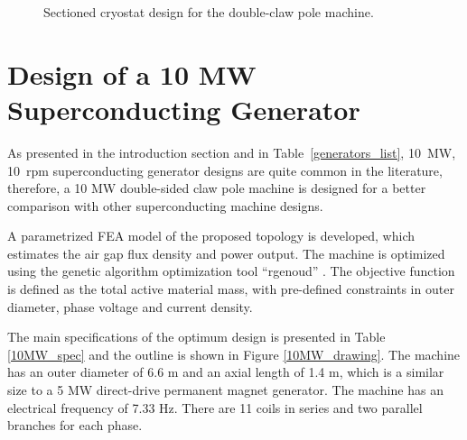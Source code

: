 \documentclass[12pt]{iopart}
\begin{document}
\begin{figure}[]
    \caption{Sectioned cryostat design for the double-claw pole machine.} 
    \label{cryostat_variants}
\end{figure}

\section{Design of a 10 MW Superconducting Generator}
 
As presented in the introduction section and in Table~\ref{generators_list}, 10~MW, 10~rpm superconducting generator designs are quite common in the literature, therefore, a 10 MW double-sided claw pole machine is designed for a better comparison with other superconducting machine designs.

A parametrized FEA model of the proposed topology is developed, which estimates the air gap flux density and power output. The machine is optimized using the genetic algorithm optimization tool ``rgenoud'' \cite{Mebane2011}. 
The objective function is defined as the total active material mass, with pre-defined constraints in outer diameter, phase voltage and current density.


The main specifications of the optimum design is presented in Table \ref{10MW_spec} and the outline is shown in Figure \ref{10MW_drawing}. The machine has an outer diameter of 6.6 m and an axial length of 1.4 m, which is a similar size to a 5 MW direct-drive permanent magnet generator. The machine has an electrical frequency of 7.33 Hz. There are 11 coils in series and two parallel branches for each phase.
\end{document}
